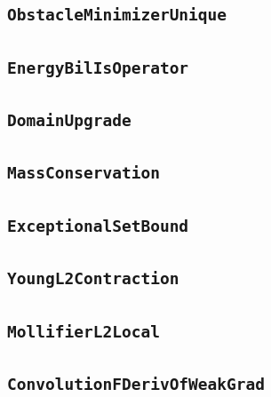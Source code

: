 \documentclass[11pt]{amsart}
\theoremstyle{definition}
\begin{document}
\subsection{\texorpdfstring{\texttt{ObstacleMinimizerUnique}}{ObstacleMinimizerUnique}}\label{node:ObstacleMinimizerUnique}


\subsection{\texorpdfstring{\texttt{EnergyBilIsOperator}}{EnergyBilIsOperator}}\label{node:EnergyBilIsOperator}


\subsection{\texorpdfstring{\texttt{DomainUpgrade}}{DomainUpgrade}}\label{node:DomainUpgrade}


\subsection{\texorpdfstring{\texttt{MassConservation}}{MassConservation}}\label{node:MassConservation}


\subsection{\texorpdfstring{\texttt{ExceptionalSetBound}}{ExceptionalSetBound}}\label{node:ExceptionalSetBound}


\subsection{\texorpdfstring{\texttt{YoungL2Contraction}}{YoungL2Contraction}}\label{node:YoungL2Contraction}


\subsection{\texorpdfstring{\texttt{MollifierL2Local}}{MollifierL2Local}}\label{node:MollifierL2Local}


\subsection{\texorpdfstring{\texttt{ConvolutionFDerivOfWeakGrad}}{ConvolutionFDerivOfWeakGrad}}\label{node:ConvolutionFDerivOfWeakGrad}

\end{document}

